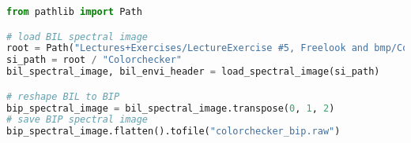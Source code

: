 \begin{lstlisting}[language=python, caption=Load spectral image of coin, label={code:save-bip}]
from pathlib import Path

# load BIL spectral image
root = Path("Lectures+Exercises/LectureExercise #5, Freelook and bmp/Colorchecker 121 ms (for Freelook demo)/capture/")
si_path = root / "Colorchecker"
bil_spectral_image, bil_envi_header = load_spectral_image(si_path)

# reshape BIL to BIP
bip_spectral_image = bil_spectral_image.transpose(0, 1, 2)
# save BIP spectral image
bip_spectral_image.flatten().tofile("colorchecker_bip.raw")

\end{lstlisting}

